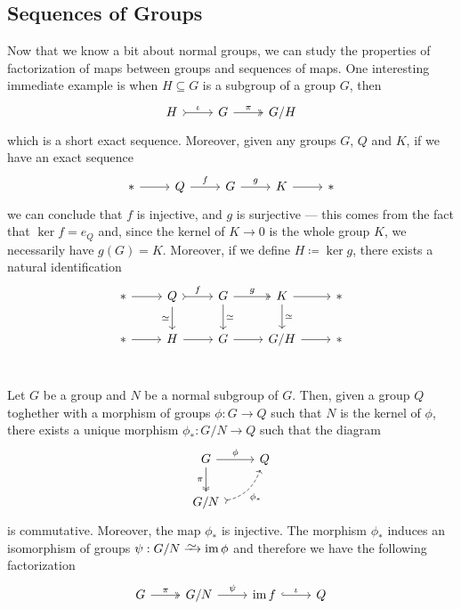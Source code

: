 
\subsection{Sequences of Groups}

Now that we know a bit about normal groups, we can study the properties of
factorization of maps between groups and sequences of maps. One interesting
immediate example is when \(H \subseteq G\) is a subgroup of a group \(G\), then
\[
  \begin{tikzcd}
    H \ar[r, tail, "\iota"] &G \ar[r, two heads, "\pi"] &G/H
  \end{tikzcd}
\]
which is a short exact sequence. Moreover, given any groups \(G\), \(Q\) and
\(K\), if we have an exact sequence
\[
  \begin{tikzcd}
    * \ar[r] &Q \ar[r, "f"] &G \ar[r, "g"] &K \ar[r] &*
  \end{tikzcd}
\]
we can conclude that \(f\) is injective, and \(g\) is surjective --- this comes
from the fact that \(\ker f = e_Q\) and, since the kernel of \(K \to 0\) is the
whole group \(K\), we necessarily have \(g(G) = K\). Moreover, if we define \(H
\coloneq \ker g\), there exists a natural identification
\[
  \begin{tikzcd}
    * \ar[r]
    &Q \ar[d, swap, "\iso"] \ar[r, tail, "f"]
    &G \ar[r, two heads, "g"] \ar[d, "\iso"]
    &K \ar[r] \ar[d, "\iso"]
    &* \\
    * \ar[r] &H \ar[r] &G \ar[r] &G/H \ar[r] &* \\
  \end{tikzcd}
\]

\begin{proposition}
\label{prop:universal-property-quotients-grp}
Let \(G\) be a group and \(N\) be a normal subgroup of \(G\). Then, given a
group \(Q\) toghether with a morphism of groups \(\phi: G \to Q\) such that
\(N\) is the kernel of \(\phi\), there exists a unique morphism \(\phi_{*}: G/N
\to Q\) such that the diagram
\[
  \begin{tikzcd}
    G \ar[d, two heads, swap, "\pi"] \ar[r, "\phi"] &Q \\
    G/N \ar[ur, dashed, swap, bend right, tail, "\phi_{*}"] &
  \end{tikzcd}
\]
is commutative. Moreover, the map \(\phi_*\) is injective. The morphism
\(\phi_{*}\) induces an isomorphism of groups \(\psi: G/N \isoto \im \phi\) and
therefore we have the following factorization
\[
  \begin{tikzcd}
    G \ar[r, two heads, "\pi"] &G/N \ar[r, "\psi"]
    &\im f \ar[r, hook, "\iota"] &Q
  \end{tikzcd}
\]
\end{proposition}

